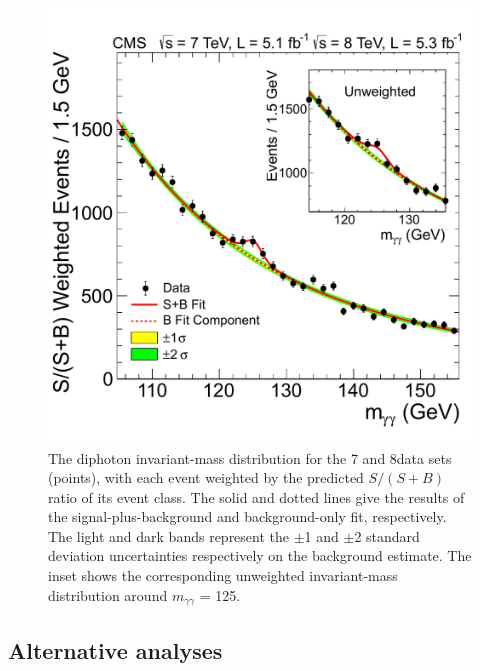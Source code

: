 \documentclass[11pt,twoside,a4paper,cmspaper,final,collab]{cms-tdr}
\begin{document}
\begin{figure}
 \begin{center}
   \includegraphics[width=0.63\linewidth]{figures/hgg_MassFactSoBWeightedMass}
   \caption{The diphoton invariant-mass
       distribution for the 7 and 8\TeV data sets (points), with each event weighted
       by the predicted $S/(S+B)$ ratio of its event class. The solid and dotted lines
       give the results of the signal-plus-background and background-only fit, respectively.
       The light and dark
       bands represent the $\pm$1 and $\pm$2 standard deviation
       uncertainties respectively on the background estimate.
       The inset shows the corresponding unweighted invariant-mass distribution around
      $m_{\gamma\gamma}$ = 125\GeV.
        }
   \label{fig:hgg_MassFactSoB}
 \end{center}
\end{figure}



\subsection{Alternative analyses}
\label{sec:hgg_crosscheck}
\end{document}
